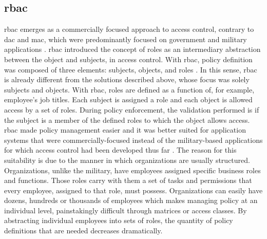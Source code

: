 \subsection{\glsdesc{rbac}}

\glsdesc{rbac} emerges as a commercially focused approach to access control, contrary to \gls{dac} and \gls{mac}, which were predominantly focused on government and military applications \cite{ferraiolo_role-based_1992}. \gls{rbac} introduced the concept of roles as an intermediary abstraction between the object and subjects, in access control. With \gls{rbac}, policy definition was composed of three elements: subjects, objects, and roles \cite{ferraiolo_role-based_1992}. In this sense, \gls{rbac} is already different from the solutions described above, whose focus was solely subjects and objects. With \gls{rbac}, roles are defined as a function of, for example, employee’s job titles. Each subject is assigned a role and each object is allowed access by a set of roles. During policy enforcement, the validation performed is if the subject is a member of the defined roles to which the object allows access. \gls{rbac} made policy management easier and it was better suited for application systems that were commercially-focused instead of the military-based applications for which access control had been developed thus far \cite{ferraiolo_role-based_1995}. The reason for this suitability is due to the manner in which organizations are usually structured. Organizations, unlike the military, have employees assigned specific business roles and functions. Those roles carry with them a set of tasks and permissions that every employee, assigned to that role, must possess. Organizations can easily have dozens, hundreds or thousands of employees which makes managing policy at an individual level, painstakingly difficult through matrices or access classes. By abstracting individual employees into sets of roles, the quantity of policy definitions that are needed decreases dramatically.


